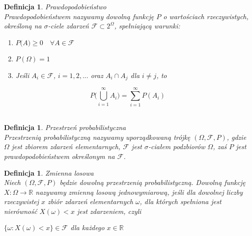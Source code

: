 \documentclass[12pt,a4paper]{report}
\newtheorem{definition}[theorem]{Definicja}
\begin{document}
\begin{definition}{Prawdopodobieństwo \cite[w oparciu o rozdział 1.1]{krysicki1999}\\}
Prawdopodobieństwem nazywamy dowolną funkcję $P$ o wartościach rzeczywistych, określoną na $\sigma$-ciele zdarzeń $\mathcal{F} \subset 2^\Omega$, spełniającą warunki: \\
\begin{enumerate}
\item $\textit{P(A)} \geq 0 \quad \forall{\textit{A} \in \mathcal{F}}$
\item $\textit{P}(\Omega) = 1$
\item Jeśli $\textit{A}_{i} \in \mathcal{F}$, $i= 1, 2, ...$ oraz $A_{i} \cap A_{j}$ dla $i \neq j$, to 
\end{enumerate}
\begin{center}
$$P \Big(\bigcup\limits_{i=1}^{\infty} A_{i} \Big)=\sum_{i=1}^{\infty} P(A_{i}) $$\\
\end{center}
\end{definition}


\begin{definition}{Przestrzeń probabilistyczna \cite[w oparciu o rozdział 1.2]{krysicki1999}\\}
Przestrzenią probabilistyczną nazywamy uporządkowaną trójkę $(\Omega, \mathcal{F}, P)$, gdzie $\Omega$ jest zbiorem zdarzeń elementarnych, $\mathcal{F}$ jest $\sigma$-ciałem podzbiorów $\Omega$, zaś $P$ jest prawdopodobieństwem określonym na $\mathcal{F}$.\\
\end{definition}




\begin{definition}{Zmienna losowa \cite[Rozdział 2.1]{krysicki1999}\\}
Niech $(\Omega, \mathcal{F}, P)$ będzie dowolną przestrzenią probabilistyczną. Dowolną funkcję $\textit{X} : \Omega \rightarrow \mathbb{R}$ nazywamy zmienną losową jednowymiarową, jeśli dla dowolnej liczby rzeczywistej $x$ zbiór zdarzeń elementarnych $\omega$, dla których spełniona jest nierówność $X(\omega)< x$ jest zdarzeniem, czyli 
\begin{center}
$\{\omega: X(\omega) < x \} \in \mathcal{F}$ dla każdego $x \in \mathbb{R}$\\
\end{center}
\end{definition}
\end{document}
